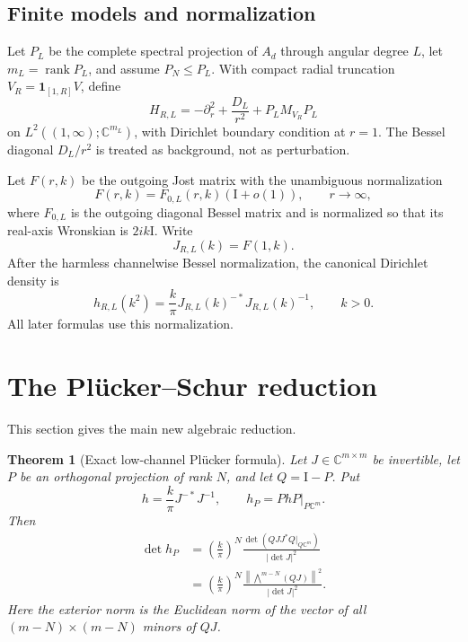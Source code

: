 \documentclass[11pt]{article}
\newcommand{\C}{\mathbb C}
\newcommand{\Id}{\mathrm I}
\DeclareMathOperator{\rank}{rank}
\newtheorem{theorem}{Theorem}[section]
\theoremstyle{definition}
\theoremstyle{remark}
\begin{document}
\subsection{Finite models and normalization}

Let $P_L$ be the complete spectral projection of $A_d$ through angular degree $L$, let $m_L=\rank P_L$, and assume $P_N\leq P_L$.  With compact radial truncation $V_R=\mathbf1_{[1,R]}V$, define
\begin{equation}
 H_{R,L}=-\partial_r^2+\frac{D_L}{r^2}+P_LM_{V_R}P_L
 \label{eq:finite-H}
\end{equation}
on $L^2((1,\infty);\C^{m_L})$, with Dirichlet boundary condition at $r=1$.  The Bessel diagonal $D_L/r^2$ is treated as background, not as perturbation.

Let $F(r,k)$ be the outgoing Jost matrix with the unambiguous normalization
\begin{equation}
 F(r,k)=F_{0,L}(r,k)(\Id+o(1)),
 \qquad r\to\infty,
 \label{eq:jost-normalization}
\end{equation}
where $F_{0,L}$ is the outgoing diagonal Bessel matrix and is normalized so that its real-axis Wronskian is $2ik\Id$.  Write
\begin{equation}
 J_{R,L}(k)=F(1,k).
 \label{eq:J}
\end{equation}
After the harmless channelwise Bessel normalization, the canonical Dirichlet density is
\begin{equation}
 h_{R,L}(k^2)=\frac{k}{\pi}J_{R,L}(k)^{-*}J_{R,L}(k)^{-1},
 \qquad k>0.
 \label{eq:canonical-density}
\end{equation}
All later formulas use this normalization.

\section{The Pl\"ucker--Schur reduction}

This section gives the main new algebraic reduction.

\begin{theorem}[Exact low-channel Pl\"ucker formula]\label{thm:plucker}
Let $J\in\C^{m\times m}$ be invertible, let $P$ be an orthogonal projection of rank $N$, and let $Q=\Id-P$.  Put
\begin{equation}
 h=\frac{k}{\pi}J^{-*}J^{-1},
 \qquad h_P=PhP\big|_{P\C^m}.
\end{equation}
Then
\begin{align}
 \det h_P
 &=\left(\frac{k}{\pi}\right)^N
   \frac{\det\!\left(QJJ^*Q\big|_{Q\C^m}\right)}{|\det J|^2}
 \label{eq:jacobi-ratio}\\
 &=\left(\frac{k}{\pi}\right)^N
   \frac{\left\|\bigwedge^{m-N}(QJ)\right\|^2}{|\det J|^2}.
 \label{eq:plucker-ratio}
\end{align}
Here the exterior norm is the Euclidean norm of the vector of all $(m-N)\times(m-N)$ minors of $QJ$.
\end{theorem}
\end{document}
